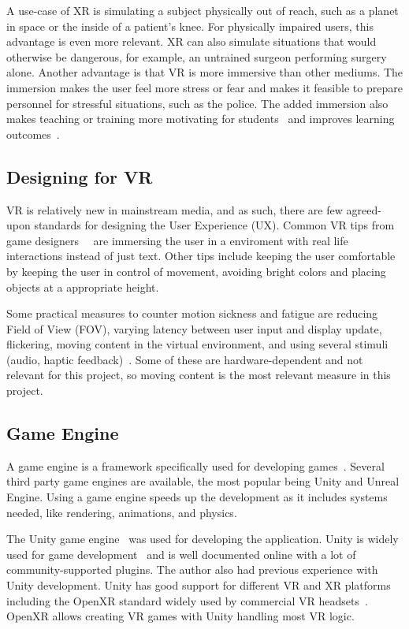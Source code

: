 \documentclass[a4paper]{report}
\begin{document}
A use-case of XR is simulating a subject physically out of reach, such as a planet in space or the inside of a patient's knee. For physically impaired users, this advantage is even more relevant.
XR can also simulate situations that would otherwise be dangerous, for example, an untrained surgeon performing surgery alone.
Another advantage is that VR is more immersive than other mediums. The immersion makes the user feel more stress or fear and makes it feasible to prepare personnel for stressful situations, such as the police.
The added immersion also makes teaching or training more motivating for students~\cite{freina_immersive_2015} and improves learning outcomes~\cite{cynthia_l_foronda_virtual_nodate}.

\subsection{Designing for VR}
VR is relatively new in mainstream media, and as such, there are few agreed-upon standards for designing the User Experience (UX).
Common VR tips from game designers~\cite{vrdesign_best_nodate}~\cite{vrdesignadobe_virtual_nodate} are immersing the user in a enviroment with real life interactions instead of just text. Other tips include keeping the user comfortable by keeping the user in control of movement, avoiding bright colors and placing objects at a appropriate height.

Some practical measures to counter motion sickness and fatigue are reducing Field of View (FOV), varying latency between user input and display update, flickering, moving content in the virtual environment, and using several stimuli (audio, haptic feedback)~\cite{chang_virtual_2020}. 
Some of these are hardware-dependent and not relevant for this project, so moving content is the most relevant measure in this project.

\subsection{Game Engine}
A game engine is a framework specifically used for developing games~\cite{gameengine_what_nodate}. Several third party game engines are available, the most popular being Unity and Unreal Engine.
Using a game engine speeds up the development as it includes systems needed, like rendering, animations, and physics.

The Unity game engine~\cite{technologies_unity_nodate} was used for developing the application. Unity is widely used for game development~\cite{doucet_game_2021} and is well documented online with a lot of community-supported plugins. The author also had previous experience with Unity development.
Unity has good support for different VR and XR platforms~\cite{technologies_unity_nodate-3} including the OpenXR standard widely used by commercial VR headsets~\cite{noauthor_openxr_2016}. OpenXR allows creating VR games with Unity handling most VR logic.
\end{document}
